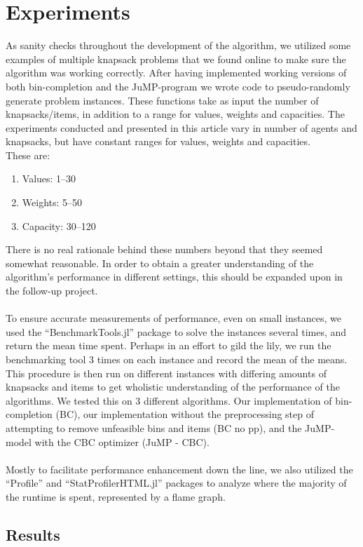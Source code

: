 \documentclass[b5paper]{article}
\begin{document}
\section{Experiments}
As sanity checks throughout the development of the algorithm, we utilized some examples of
multiple knapsack problems that we found online to make sure the algorithm was working correctly.
After having implemented working versions of both bin-completion and the JuMP-program we wrote code to pseudo-randomly generate problem instances.
These functions take as input the number of knapsacks/items, in addition to a range for values, weights and capacities.
The experiments conducted and presented in this article vary in number of agents and knapsacks, but have constant ranges for values, weights and capacities.
\\
These are:
\begin{enumerate}
    \item Values: 1--30
    \item Weights: 5--50
    \item Capacity: 30--120
\end{enumerate}
There is no real rationale behind these numbers beyond that they seemed somewhat reasonable.
In order to obtain a greater understanding of the algorithm's performance in different settings, this should be expanded upon in the follow-up project.
\\ \\
To ensure accurate measurements of performance, even on small instances, we used the ``BenchmarkTools.jl'' package to solve the instances several times, and return the mean time spent.
Perhaps in an effort to gild the lily, we run the benchmarking tool 3 times on each instance and record the mean of the means.
This procedure is then run on different instances with differing amounts of knapsacks and items to get wholistic understanding of the performance of the algorithms.
We tested this on 3 different algorithms. Our implementation of bin-completion (BC), our implementation without the preprocessing step of attempting to remove unfeasible bins and items (BC no pp),
and the JuMP-model with the CBC optimizer (JuMP - CBC).
\\ \\
Mostly to facilitate performance enhancement down the line, we also utilized the ``Profile'' and ``StatProfilerHTML.jl'' packages to
analyze where the majority of the runtime is spent, represented by a flame graph.
\subsection{Results}
\end{document}

